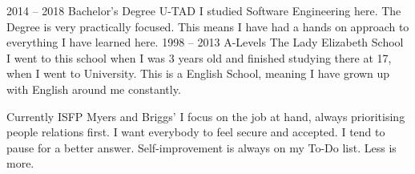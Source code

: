\documentclass[9pt]{developercv} %
\begin{document}


\begin{entrylist}
	\entry
		{2014 -- 2018}
		{Bachelor's Degree}
		{U-TAD}
		{I studied Software Engineering here. The Degree is very practically focused. This means I have had a hands on approach to everything I have learned here.}
	\entry
		{1998 -- 2013}
		{A-Levels}
		{The Lady Elizabeth School}
		{I went to this school when I was 3 years old and finished studying there at 17, when I went to University. This is a English School, meaning I have grown up with English around me constantly.}
\end{entrylist}


\begin{entrylist}
	\entry
		{Currently}
		{ISFP}
		{Myers and Briggs'}
		{I focus on the job at hand, always prioritising people relations first.
		I want everybody to feel secure and accepted.
		I tend to pause for a better answer.
		Self-improvement is always on my To-Do list.
		Less is more.}
\end{entrylist}

\end{document}
